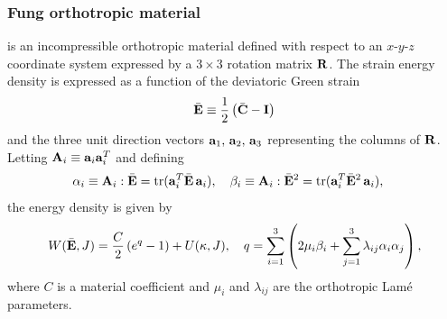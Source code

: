  \subsubsection{Fung orthotropic material}

is an incompressible orthotropic material defined with respect to an
$x$-$y$-$z$ coordinate system expressed by a $3 \times 3$ rotation
matrix ${\bf R}$. The strain energy density is expressed as a function of
the deviatoric Green strain
%
\begin{equation}
\bar{{\bf E}} \equiv \frac{1}{2}\left(\bar{{\bf C}} - {\bf I} \right)
\end{equation}
%
and the three unit direction vectors ${\bf a}_1,\, {\bf a}_2,\, {\bf a}_3$
representing the columns of ${\bf R}$. Letting ${\bf A}_i \equiv {\bf a}_i {\bf a}_i^T$
and defining
%
\begin{equation}
\alpha_i \equiv {\bf A}_i : \bar{{\bf E}} = \operatorname{tr}({\bf a}_i^T \bar{{\bf E}} \,{\bf a}_i), \quad
\beta_i \equiv {\bf A}_i : \bar{{\bf E}}^2 = \operatorname{tr}({\bf a}_i^T \bar{{\bf E}}^2 \,{\bf a}_i), \quad
\end{equation}
%
the energy density is given by
%
\begin{equation}
W(\bar{{\bf E}},J) = \frac{C}{2}\left(e^q - 1\right) + U(\kappa,J),
\quad 
q = \sum_{i=1}^3 \left(
2 \mu_i \beta_i + \sum_{j=1}^3 \lambda_{ij} \alpha_i \alpha_j 
\right),
\end{equation}
%
where $C$ is a material coefficient and $\mu_i$ and $\lambda_{ij}$ are
the orthotropic Lam\'e parameters.

